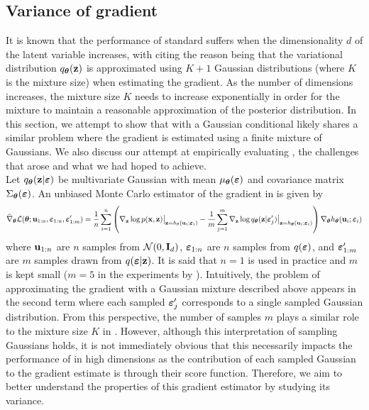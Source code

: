 \documentclass[10pt]{article}
\begin{document}
\subsection{Variance of gradient} \label{sec:variance}

It is known that the performance of standard \sivi suffers when the dimensionality $d$ of the latent variable increases, with \citet{Molchanova:2019} citing the reason being that the variational distribution $q_{\bm{\theta}}(\mathbf{z})$ is approximated using $K+1$ Gaussian distributions (where $K$ is the mixture size) when estimating the \elbo gradient. As the number of dimensions increases, the mixture size $K$ needs to increase exponentially in order for the mixture to maintain a reasonable approximation of the posterior distribution. In this section, we attempt to show that \uivi with a Gaussian conditional likely shares a similar problem where the \elbo gradient is estimated using a finite mixture of Gaussians. We also discuss our attempt at empirically evaluating \uivi, the challenges that arose and what we had hoped to achieve.
\\

Let $q_{\bm{\theta}}(\mathbf{z}|\bm{\varepsilon})$ be multivariate Gaussian with mean $\mu_{\bm{\theta}}(\bm{\varepsilon})$ and covariance matrix $\Sigma_{\bm{\theta}}(\bm{\varepsilon})$. An unbiased Monte Carlo estimator of the \elbo gradient in \uivi is given by
\[
\widehat{\nabla}_{\bm{\theta}}\mathcal{L}({\bm{\theta}};\mathbf{u}_{1:n},\bm{\varepsilon}_{1:n},\bm{\varepsilon}_{1:m}') = \frac{1}{n}\sum_{i=1}^n \left(\nabla_{\mathbf{z}}\log p(\mathbf{x},\mathbf{z})\big|_{\mathbf{z}=h_\theta(\mathbf{u}_i;\bm{\varepsilon}_i)} - \frac{1}{m}\sum_{j=1}^m \nabla_{\mathbf{z}}\log q_{\bm{\theta}}(\mathbf{z}|\bm{\varepsilon}_j')\big|_{\mathbf{z}=h_{\bm{\theta}}(\mathbf{u}_i;\bm{\varepsilon}_i)} \right)\nabla_{\bm{\theta}} h_{\bm{\theta}}(\mathbf{u}_i;\bm{\varepsilon}_i)
\]
where $\mathbf{u}_{1:n}$ are $n$ \iid samples from $\mathcal{N}(0,\mathbf{I}_d)$, $\bm{\varepsilon}_{1:n}$ are $n$ \iid samples from $q(\bm{\varepsilon})$, and $\bm{\varepsilon}_{1:m}'$ are $m$ \mcmc samples drawn from $q(\bm{\varepsilon}|\mathbf{z})$. It is said that $n=1$ is used in practice and $m$ is kept small ($m=5$ in the experiments by \citet{Titsias:2019}). Intuitively, the problem of approximating the \elbo gradient with a Gaussian mixture described above appears in the second term where each sampled $\bm{\varepsilon}_j'$ corresponds to a single sampled Gaussian distribution. From this perspective, the number of \mcmc samples $m$ plays a similar role to the mixture size $K$ in \sivi. However, although this interpretation of sampling Gaussians holds, it is not immediately obvious that this necessarily impacts the performance of \uivi in high dimensions as the contribution of each sampled Gaussian to the gradient estimate is through their score function. Therefore, we aim to better understand the properties of this gradient estimator by studying its variance.
\\
\end{document}
